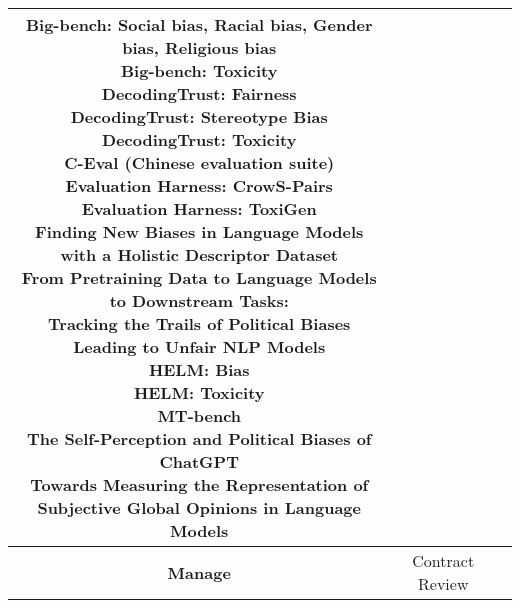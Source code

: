 \documentclass[fleqn]{article}
\begin{document}
\begin{landscape}
\begin{table}[H]
\begin{tabular}{|c|c|c|}
{			\textbullet\hspace{3pt} Big-bench: Social bias, Racial bias, Gender bias, Religious bias \\
			\textbullet\hspace{3pt} Big-bench: Toxicity \\
			\textbullet\hspace{3pt} DecodingTrust: Fairness \\
			\textbullet\hspace{3pt} DecodingTrust: Stereotype Bias \\
			\textbullet\hspace{3pt} DecodingTrust: Toxicity \\
			\textbullet\hspace{3pt} C-Eval (Chinese evaluation suite) \\
			\textbullet\hspace{3pt} Evaluation Harness: CrowS-Pairs  \\
			\textbullet\hspace{3pt} Evaluation Harness: ToxiGen \\
			\textbullet\hspace{3pt} Finding New Biases in Language Models with a Holistic Descriptor Dataset \\
			\textbullet\hspace{3pt} From Pretraining Data to Language Models to Downstream Tasks:\\\hspace{10pt}Tracking the Trails of Political Biases Leading to Unfair NLP Models \\
			\textbullet\hspace{3pt} HELM: Bias \\
			\textbullet\hspace{3pt} HELM: Toxicity \\
			\textbullet\hspace{3pt} MT-bench \\
			\textbullet\hspace{3pt} The Self-Perception and Political Biases of ChatGPT \\
			\textbullet\hspace{3pt} Towards Measuring the Representation of\\\hspace{10pt} Subjective Global Opinions in Language Models
		}
		\\
		\hline		
		\textbf{Manage} &
		\makecell[l]{	
			\textbullet\hspace{3pt} Contract Review\\ 	
}
\end{tabular}
\end{table}
\end{landscape}
\end{document}
